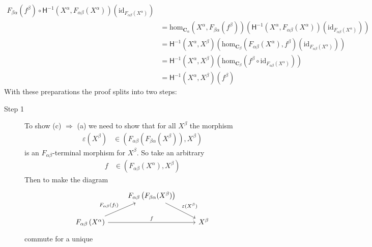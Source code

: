 \begin{prf}
\begin{align*}
  F_{\beta\alpha}(f^{\beta})
  \circ
  \mathsf{H}^{-1}
  \left(
    X^{\alpha},
    F_{\alpha\beta}(X^{\alpha})
  \right)
  \left(
    \mathrm{id}_{F_{\alpha\beta}(X^{\alpha})}
  \right)
  \\
  &=
  \mathrm{hom}_{\mathbf{C}_{\alpha}}
  \left(
    X^{\alpha},
    F_{\beta\alpha}(f^{\beta})
  \right)
  \left(
    \mathsf{H}^{-1}
    \left(
      X^{\alpha},
      F_{\alpha\beta}(X^{\alpha})
    \right)
    \left(
      \mathrm{id}_{F_{\alpha\beta}(X^{\alpha})}
    \right)
  \right)
  \\
  &=
  \mathsf{H}^{-1}
  \left(
    X^{\alpha},
    X^{\beta}
  \right)
  \left(
    \mathrm{hom}_{\mathbf{C}_{\beta}}
    \left(
      F_{\alpha\beta}(X^{\alpha}),
      f^{\beta}
    \right)
    \left(
      \mathrm{id}_{F_{\alpha\beta}(X^{\alpha})}
    \right)
  \right)
  \tag{NT}
  \\
  &=
  \mathsf{H}^{-1}
  \left(
    X^{\alpha},
    X^{\beta}
  \right)
  \left(
    \mathrm{hom}_{\mathbf{C}_{\beta}}
    \left(
      f^{\beta}
      \circ
      \mathrm{id}_{F_{\alpha\beta}(X^{\alpha})}
    \right)
  \right)
  \\
  &=
  \mathsf{H}^{-1}
  \left(
    X^{\alpha},
    X^{\beta}
  \right)
  (f^{\beta})
\end{align*}
With these preparations the proof splits into two steps:
\begin{description}
\item[Step 1]
To show {\glqq}(c) $\Rightarrow$ (a){\grqq} we need to show that for all $X^{\beta}$ the morphism
\begin{align*}
  \varepsilon(X^{\beta})
  &\in
  \left(
    F_{\alpha\beta}(F_{\beta\alpha}(X^{\beta})),
    X^{\beta}
  \right)
\end{align*}
is an $F_{\alpha\beta}$-terminal morphism for $X^{\beta}$. So take an arbitrary 
\begin{align*}
  f
  &\in
  \left(
    F_{\alpha\beta}
    \left(
      X^{\alpha}
    \right),
    X^{\beta}
  \right)
\end{align*}
Then to make the diagram
\[
\begin{tikzcd}[sep=normal]
  &
  F_{\alpha\beta}
  \left(
    F_{\beta\alpha}(X^{\beta})
  \right)
  \arrow{dr}{\varepsilon(X^{\beta})}
  &
  \\
  F_{\alpha\beta}
  \left(
    X^{\alpha}
  \right)
  \arrow{ur}{F_{\alpha\beta}(f_{!})}
  \arrow{rr}{f}
  &
  &
  X^{\beta}
\end{tikzcd}
\]
commute for a unique
\begin{align*}

\end{align*}
\end{description}
\end{prf}
